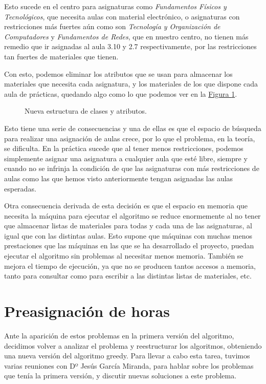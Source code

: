 Esto sucede en el centro para asignaturas como \textit{Fundamentos Físicos y Tecnológicos}, que necesita aulas con material electrónico, o asignaturas con restricciones más fuertes aún como son \textit{Tecnología y Organización de Computadores} y \textit{Fundamentos de Redes}, que en nuestro centro, no tienen más remedio que ir asignadas al aula 3.10 y 2.7 respectivamente, por las restricciones tan fuertes de materiales que tienen.

Con esto, podemos eliminar los atributos que se usan para almacenar los materiales que necesita cada asignatura, y los materiales de los que dispone cada aula de prácticas, quedando algo como lo que podemos ver en la \hyperref[clases3]{Figura \ref*{clases3}}.

\begin{figure}[H]
  
  \caption{Nueva estructura de clases y atributos.}
  \label{clases3}
\end{figure}

Esto tiene una serie de consecuencias y una de ellas es que el espacio de búsqueda para realizar una asignación de aulas crece, por lo que el problema, en la teoría, se dificulta. En la práctica sucede que al tener menos restricciones, podemos simplemente asignar una asignatura a cualquier aula que esté libre, siempre y cuando no se infrinja la condición de que las asignaturas con más restricciones de aulas como las que hemos visto anteriormente tengan asignadas las aulas esperadas.

Otra consecuencia derivada de esta decisión es que el espacio en memoria que necesita la máquina para ejecutar el algoritmo se reduce enormemente al no tener que almacenar listas de materiales para todas y cada una de las asignaturas, al igual que con las distintas aulas. Esto supone que máquinas con muchas menos prestaciones que las máquinas en las que se ha desarrollado el proyecto, puedan ejecutar el algoritmo sin problemas al necesitar menos memoria. También se mejora el tiempo de ejecución, ya que no se producen tantos accesos a memoria, tanto para consultar como para escribir a las distintas listas de materiales, etc.

\section{Preasignación de horas}
Ante la aparición de estos problemas en la primera versión del algoritmo, decidimos volver a analizar el problema y reestructurar los algoritmos, obteniendo una nueva versión del algoritmo greedy. Para llevar a cabo esta tarea, tuvimos varias reuniones con Dº Jesús García Miranda, para hablar sobre los problemas que tenía la primera versión, y discutir nuevas soluciones a este problema. 

